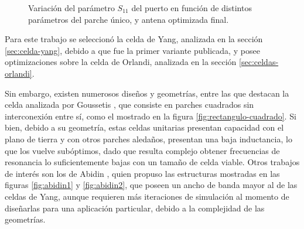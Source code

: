 \begin{figure}[htp]
	\centering 
	\hspace{30pt}
	\hspace{30pt}
	\hspace{30pt}
	\caption{Variación del parámetro $S_{11}$ del puerto en función de distintos parámetros del parche único, y antena optimizada final.}
	\label{fig:posibles-geometrias}
\end{figure}

Para este trabajo se seleccionó la celda de Yang, analizada en la sección \ref{sec:celda-yang}, debido a que fue la primer variante publicada, y posee optimizaciones sobre la celda de Orlandi, analizada en la sección \ref{sec:celdas-orlandi}.

Sin embargo, existen numerosos diseños y geometrías, entre las que destacan la celda analizada por Goussetis \cite{Goussetis:TailoringAMCEBGCharacteristics}, que consiste en parches cuadrados sin interconexión entre sí, como el mostrado en la figura \ref{fig:rectangulo-cuadrado}. Si bien, debido a su geometría, estas celdas unitarias presentan capacidad con el plano de tierra y con otros parches aledaños, presentan una baja inductancia, lo que los vuelve subóptimos, dado que resulta complejo obtener frecuencias de resonancia lo suficientemente bajas con un tamaño de celda viable. Otros trabajos de interés son los de Abidin \cite{Abidin:Thesis}, quien propuso las estructuras mostradas en las figuras \ref{fig:abidin1} y \ref{fig:abidin2}, que poseen un ancho de banda mayor al de las celdas de Yang, aunque requieren más iteraciones de simulación al momento de diseñarlas para una aplicación particular, debido a la complejidad de las geometrías.

